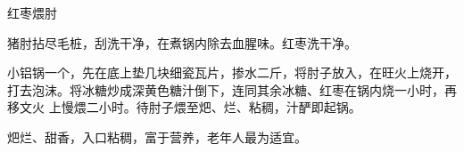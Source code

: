 \begin{recipe}{红枣煨肘}

\ingredients


\preparation

\step 猪肘拈尽毛桩，刮洗干净，在煮锅内除去血腥味。红枣洗干净。

\step 小铝锅一个，先在底上垫几块细瓷瓦片，掺水二斤，将肘子放入，在旺火上烧开，
打去泡沫。将冰糖炒成深黄色糖汁倒下，连同其余冰糖、红枣在锅内烧一小时，再移文火
上慢煨二小时。待肘子煨至𤆵、烂、粘稠，汁酽即起锅。

\features

𤆵烂、甜香，入口粘稠，富于营养，老年人最为适宜。

\end{recipe}

